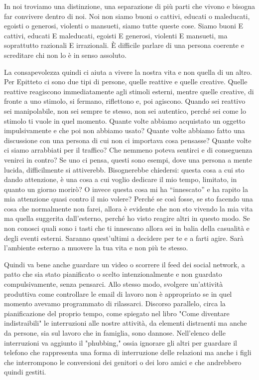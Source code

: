 \documentclass[12pt]{book} %
\begin{document}
In noi troviamo una distinzione, una separazione di più parti che vivono e bisogna far convivere dentro di
noi. Noi non siamo buoni o cattivi, educati o maleducati, egoisti o generosi, violenti o mansueti, siamo tutte queste
cose. Siamo buoni E cattivi, educati E maleducati, egoisti E generosi, violenti E mansueti, ma soprattutto razionali E
irrazionali. È difficile parlare di una persona coerente e screditare chi non lo è in senso assoluto.

La consapevolezza quindi ci aiuta a vivere la nostra vita e non quella di un altro.
Per Epitteto ci sono due tipi di persone, quelle reattive e quelle creative. Quelle reattive reagiscono immediatamente
agli stimoli esterni, mentre quelle creative, di fronte a uno stimolo, si fermano, riflettono e, poi agiscono. Quando
sei reattivo sei manipolabile, non sei sempre te stesso, non sei autentico, perché sei come lo stimolo ti vuole in quel
momento. Quante volte abbiamo acquistato un oggetto impulsivamente e che poi non abbiamo usato? Quante volte
abbiamo fatto una discussione con una persona di cui non ci importava cosa pensasse? Quante volte ci siamo arrabbiati
per il traffico? Che nemmeno poteva sentirci e di conseguenza venirci in contro? Se uno ci pensa, questi sono esempi,
dove una persona a mente lucida, difficilmente si attiverebb. Bisognerebbe chiedersi: questa cosa a cui sto dando
attenzione, è una cosa a cui voglio dedicare il mio tempo, limitato, in quanto un giorno morirò? O invece questa cosa
mi ha “innescato” e ha rapito la mia attenzione quasi contro il mio volere? Perché se così fosse, se sto facendo una
cosa che normalmente non farei, allora è evidente che non sto vivendo la mia vita ma quella suggerita
dall'esterno, perché ho visto reagire altri in questo modo. Se non conosci quali sono i tasti che ti innescano
allora sei in balia della casualità e degli eventi esterni. Saranno quest'ultimi a decidere per te
e a farti agire. Sarà l'ambiente esterno a muovere la tua vita e non più te stesso. 

Quindi va bene anche guardare un video o scorrere il feed dei social network, a patto che sia stato pianificato o scelto intenzionalmente e non guardato compulsivamente, senza pensarci. Allo stesso modo, svolgere un’attività produttiva come controllare le email di lavoro non è appropriato se in quel momento avevamo programmato di rilassarci. Discorso parallelo, circa la pianificazione del proprio tempo, come spiegato nel libro "Come diventare indistraibili"  le interruzioni alle nostre attività, da elementi distraenti ma anche da persone, sia sul lavoro che in famiglia, sono dannose. Nell'elenco delle interruzioni va aggiunto il "phubbing," ossia ignorare gli altri per guardare il telefono che rappresenta una forma di interruzione delle relazioni ma anche i figli che interrompono le conversioni dei genitori o dei loro amici e che andrebbero quindi gestiti.
\end{document}
